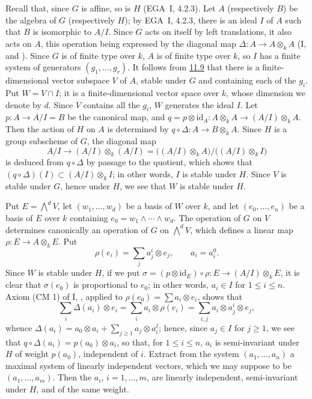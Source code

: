 Recall that, since \(G\) is affine, so is \(H\)
\textup{(EGA~I, 4.2.3)}. Let \(A\) \textup{(}respectively
\(B\)\textup{)} be the algebra of \(G\) \textup{(}respectively
\(H\)\textup{)}; by EGA~I, 4.2.3, there is an ideal \(I\) of
\(A\) such that \(B\) is isomorphic to \(A/I\). Since \(G\)
acts on itself by left translations, it also acts on \(A\),
this operation being expressed by the diagonal map
\(\Delta:A\to A\otimes_kA\) \textup{(I,
 and
)}. Since \(G\) is of
finite type over \(k\), \(A\) is of finite type over \(k\), so
\(I\) has a finite system of generators \((g_1,\ldots,g_r)\). It
follows from \hyperref[prop:sga3-VIB-11.9]{11.9} that there is a
finite-dimensional vector subspace \(V\) of \(A\), stable under
\(G\) and containing each of the \(g_i\). Put \(W=V\cap I\); it
is a finite-dimensional vector space over \(k\), whose dimension
we denote by \(d\). Since \(V\) contains all the \(g_i\), \(W\)
generates the ideal \(I\). Let \(p:A\to A/I=B\) be the canonical
map, and \(q=p\otimes\mathrm{id}_A:A\otimes_kA\to(A/I)\otimes_kA\).
Then the action of \(H\) on \(A\) is determined by
\(q\circ\Delta:A\to B\otimes_kA\). Since \(H\) is a group
subscheme of \(G\), the diagonal map
\[
  A/I\longrightarrow(A/I)\otimes_k(A/I)
  =\bigl((A/I)\otimes_kA\bigr)/\bigl((A/I)\otimes_kI\bigr)
\]
is deduced from \(q\circ\Delta\) by passage to the quotient,
which shows that \((q\circ\Delta)(I)\subset(A/I)\otimes_kI\); in
other words, \(I\) is stable under \(H\). Since \(V\) is stable
under \(G\), hence under \(H\), we see that \(W\) is stable
under \(H\).

Put \(E=\bigwedge^dV\), let \((w_1,\ldots,w_d)\) be a basis of
\(W\) over \(k\), and let \((e_0,\ldots,e_n)\) be a basis of
\(E\) over \(k\) containing \(e_0=w_1\wedge\cdots\wedge w_d\).
The operation of \(G\) on \(V\) determines canonically an
operation of \(G\) on \(\bigwedge^dV\), which defines a linear
map \(\rho:E\to A\otimes_kE\). Put
\[
  \rho(e_i)=\sum_ja^i_j\otimes e_j,
  \qquad a_i=a^0_i.
\]
Since \(W\) is stable under \(H\), if we put
\(\sigma=(p\otimes\mathrm{id}_E)\circ\rho:E\to(A/I)\otimes_kE\),
it is clear that \(\sigma(e_0)\) is proportional to \(e_0\); in
other words, \(a_i\in I\) for \(1\leq i\leq n\). Axiom
\textup{(CM 1)} of I, ,
applied to \(\rho(e_0)=\sum a_i\otimes e_i\), shows that
\[
  \sum_i\Delta(a_i)\otimes e_i=\sum_ia_i\otimes\rho(e_i)
  =\sum_{i,j}a_i\otimes a^i_j\otimes e_j,
\]
whence \(\Delta(a_i)=a_0\otimes a_i+\sum_{j\geq1}a_j\otimes a^j_i\);
hence, since \(a_j\in I\) for \(j\geq1\), we see that
\(q\circ\Delta(a_i)=p(a_0)\otimes a_i\), so that, for
\(1\leq i\leq n\), \(a_i\) is semi-invariant under \(H\) of weight
\(p(a_0)\), independent of \(i\). Extract from the system
\((a_1,\ldots,a_n)\) a maximal system of linearly independent
vectors, which we may suppose to be \((a_1,\ldots,a_m)\). Then
the \(a_i\), \(i=1,\ldots,m\), are linearly independent,
semi-invariant under \(H\), and of the same weight.


